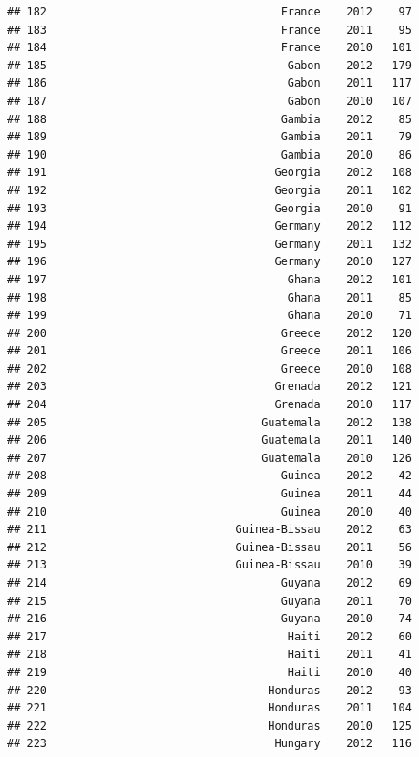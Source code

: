 \documentclass[
]{book}
\begin{document}
\begin{verbatim}
## 182                                    France    2012    97
## 183                                    France    2011    95
## 184                                    France    2010   101
## 185                                     Gabon    2012   179
## 186                                     Gabon    2011   117
## 187                                     Gabon    2010   107
## 188                                    Gambia    2012    85
## 189                                    Gambia    2011    79
## 190                                    Gambia    2010    86
## 191                                   Georgia    2012   108
## 192                                   Georgia    2011   102
## 193                                   Georgia    2010    91
## 194                                   Germany    2012   112
## 195                                   Germany    2011   132
## 196                                   Germany    2010   127
## 197                                     Ghana    2012   101
## 198                                     Ghana    2011    85
## 199                                     Ghana    2010    71
## 200                                    Greece    2012   120
## 201                                    Greece    2011   106
## 202                                    Greece    2010   108
## 203                                   Grenada    2012   121
## 204                                   Grenada    2010   117
## 205                                 Guatemala    2012   138
## 206                                 Guatemala    2011   140
## 207                                 Guatemala    2010   126
## 208                                    Guinea    2012    42
## 209                                    Guinea    2011    44
## 210                                    Guinea    2010    40
## 211                             Guinea-Bissau    2012    63
## 212                             Guinea-Bissau    2011    56
## 213                             Guinea-Bissau    2010    39
## 214                                    Guyana    2012    69
## 215                                    Guyana    2011    70
## 216                                    Guyana    2010    74
## 217                                     Haiti    2012    60
## 218                                     Haiti    2011    41
## 219                                     Haiti    2010    40
## 220                                  Honduras    2012    93
## 221                                  Honduras    2011   104
## 222                                  Honduras    2010   125
## 223                                   Hungary    2012   116

\end{verbatim}
\end{document}
